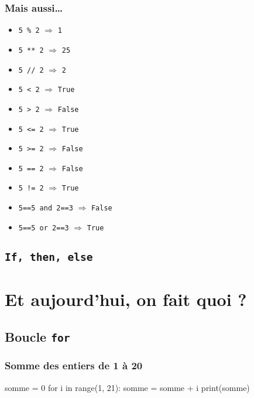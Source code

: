 \documentclass{beamer}
\begin{document}
\begin{frame}
\frametitle{Mais aussi\dots}

\begin{itemize}%
   \item<1-> \texttt{5 \% 2} $\Longrightarrow$ \pause \texttt{1} \pause
   \item<2-> \texttt{5 ** 2} $\Longrightarrow$ \pause \texttt{25} \pause
   \item<3-> \texttt{5 // 2} $\Longrightarrow$ \pause \texttt{2} \pause
   \item<4-> \texttt{5 < 2} $\Longrightarrow$ \pause \texttt{True} \pause
   \item<5-> \texttt{5 > 2} $\Longrightarrow$ \pause \texttt{False} \pause
   \item<6-> \texttt{5 <= 2} $\Longrightarrow$ \pause \texttt{True} \pause
   \item<7-> \texttt{5 >= 2} $\Longrightarrow$ \pause \texttt{False} \pause
   \item<8-> \texttt{5 == 2} $\Longrightarrow$ \pause \texttt{False} \pause
   \item<9-> \texttt{5 != 2} $\Longrightarrow$ \pause \texttt{True} \pause
   \item<10-> \texttt{5==5 and 2==3} $\Longrightarrow$ \pause \texttt{False} \pause
   \item<11-> \texttt{5==5 or 2==3} $\Longrightarrow$ \pause \texttt{True}
\end{itemize}
\end{frame}

   \subsection{\texttt{If, then, else}}\label{subsec:if-then-else}



\section{Et aujourd'hui, on fait quoi ?}\label{sec:et-aujourdhui-on-fait-quoi}
   \subsection{Boucle \texttt{for}}\label{subsec:boucle-for}
\begin{frame}[fragile]
   \frametitle{Somme des entiers de 1 à 20}
   \begin{pyverbatim}
            somme = 0
            for i in range(1, 21):
               somme = somme + i
            print(somme)
   \end{pyverbatim}
\end{frame}
\end{document}
